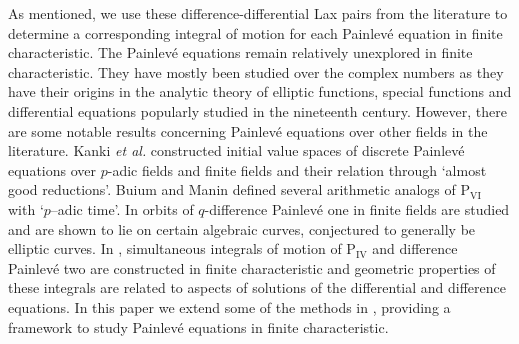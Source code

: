 \documentclass[a4paper,reqno]{amsart}
\numberwithin{equation}{section}
\numberwithin{figure}{section}
\theoremstyle{remark}
\newcommand\Pfour{\textrm{P}_{\textrm{IV}}}
\newcommand\Psix{\textrm{P}_{\textrm{VI}}}
\begin{document}
As mentioned, we use these difference-differential Lax pairs from the literature to determine a corresponding integral of motion for each Painlev\'e equation in finite characteristic. The Painlev\'e equations remain relatively unexplored in finite characteristic. They have mostly been studied over the complex numbers as they have their origins in the analytic theory of elliptic functions, special functions and differential equations popularly studied in the nineteenth century.
However, there are some notable results concerning Painlev\'e equations over other fields in the literature. Kanki \textit{et al.} \cite{kankisigma,kankirims} constructed initial value spaces of discrete Painlev\' e equations over $p$-adic fields and finite fields and their relation through `almost good reductions'. Buium and Manin \cite{buium_manin_15} defined several arithmetic analogs of $\Psix$ with `$p$–adic time'. In \cite{joshiroffelsen1} orbits of $q$-difference Painlev\'e one in finite fields are studied and are shown to lie on certain algebraic curves, conjectured to generally be elliptic curves. In \cite{joshiroffelsen}, simultaneous integrals of motion of $\Pfour$ and difference Painlev\'e two are constructed in finite characteristic and geometric properties of these integrals are related to aspects of solutions of the differential and difference equations. In this paper we extend some of the methods in \cite{joshiroffelsen}, providing a  framework to study Painlev\'e equations in finite characteristic.
\end{document}
